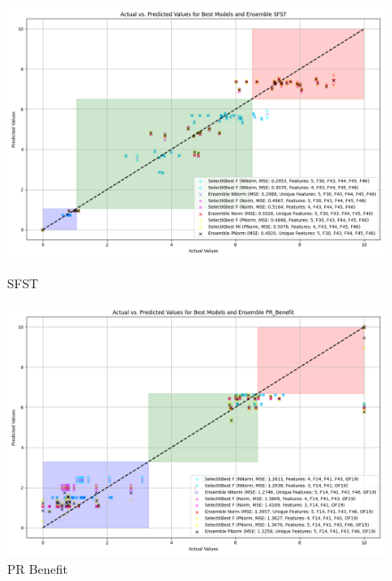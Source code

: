 \begin{figure}[H]
    \centering
    \begin{minipage}{0.45\textwidth}
        \centering
        \includegraphics[width=\linewidth]{reg_section_all/featred_ensemble_learning/actual_vs_predicted_best_feature_selection_and_ensemble_SFST_10.png}
        \caption{SFST}
        \label{reg_all_fig:sfst_featred}
    \end{minipage}\hfill
    \begin{minipage}{0.45\textwidth}
        \centering
        \includegraphics[width=\linewidth]{reg_section_all/featred_ensemble_learning/actual_vs_predicted_best_feature_selection_and_ensemble_PR_Benefit_10.png}
        \caption{PR Benefit}
        \label{reg_all_fig:pr_ben_featred}
    \end{minipage}
\end{figure}

